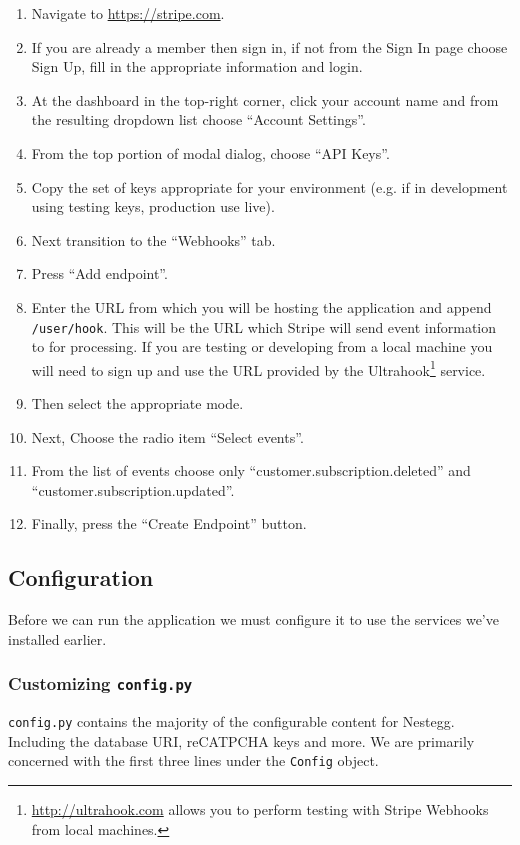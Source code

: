 \documentclass[11pt]{article}
\newcommand{\cmd}[1]{\textcolor{code}{\texttt{#1}}}
\begin{document}
				\begin{enumerate}
					\item Navigate to \url{https://stripe.com}.
					\item If you are already a member then sign in, if not from the Sign In page choose Sign Up, fill in the appropriate information and login.
					\item At the dashboard in the top-right corner, click your account name and from the resulting dropdown list choose ``Account Settings''.
					\item From the top portion of modal dialog, choose ``API Keys''.
					\item Copy the set of keys appropriate for your environment (e.g. if in development using testing keys, production use live).
					\item Next transition to the ``Webhooks'' tab.
					\item Press ``Add endpoint''.
					\item Enter the URL from which you will be hosting the application and append \cmd{/user/hook}. This will be the URL which Stripe will send event information to for processing. If you are testing or developing from a local machine you will need to sign up and use the URL provided by the Ultrahook\footnote{\url{http://ultrahook.com} allows you to perform testing with Stripe Webhooks from local machines.} service.
					\item Then select the appropriate mode.
					\item Next, Choose the radio item ``Select events''.
					\item From the list of events choose only ``customer.subscription.deleted'' and ``customer.subscription.updated''.
					\item Finally, press the ``Create Endpoint'' button.
				\end{enumerate}					
		
		\subsection{Configuration}
			Before we can run the application we must configure it to use the services we've installed earlier.
			
			\subsubsection{Customizing \cmd{config.py}}
				\cmd{config.py} contains the majority of the configurable content for Nestegg. Including the database URI, reCATPCHA keys and more. We are primarily concerned with the first three lines under the \cmd{Config} object.
				
\end{document}
